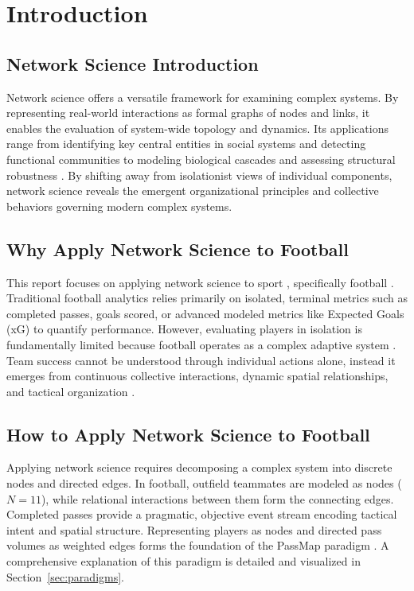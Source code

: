 \documentclass[12pt, a4paper]{article}
\begin{document}
\section{Introduction}
\label{sec:introduction}

\subsection{Network Science Introduction}
\label{subsec:net_sci_intro}
Network science offers a versatile framework for examining complex systems. By representing real-world interactions as formal graphs of nodes and links, it enables the evaluation of system-wide topology and dynamics. Its applications range from identifying key central entities in social systems \cite{wasserman1994, newman2001} and detecting functional communities \cite{fortunato2010} to modeling biological cascades \cite{pastor2001} and assessing structural robustness \cite{lusseau2003emergent, newman2003structure}. By shifting away from isolationist views of individual components, network science reveals the emergent organizational principles and collective behaviors governing modern complex systems.

\subsection{Why Apply Network Science to Football}
\label{subsec:why_network_football}
This report focuses on applying network science to sport \cite{araujo2006ecological}, specifically football \cite{duch2010quantifying}. Traditional football analytics relies primarily on isolated, terminal metrics such as completed passes, goals scored, or advanced modeled metrics like Expected Goals (xG) \cite{pollard1997xg} to quantify performance. However, evaluating players in isolation is fundamentally limited because football operates as a complex adaptive system \cite{buldu2019}. Team success cannot be understood through individual actions alone, instead it emerges from continuous collective interactions, dynamic spatial relationships, and tactical organization \cite{gama2026stoch}.

\subsection{How to Apply Network Science to Football}
\label{subsec:how_network_football}
Applying network science requires decomposing a complex system into discrete nodes and directed edges. In football, outfield teammates are modeled as nodes ($N = 11$), while relational interactions between them form the connecting edges. Completed passes provide a pragmatic, objective event stream encoding tactical intent and spatial structure. Representing players as nodes and directed pass volumes as weighted edges forms the foundation of the PassMap paradigm \cite{buldu2018}. A comprehensive explanation of this paradigm is detailed and visualized in Section~\ref{sec:paradigms}.
\end{document}
